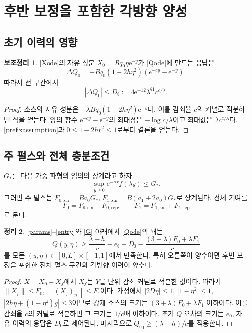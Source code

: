 \documentclass[11pt,a4paper]{article}
\theoremstyle{definition}
\newtheorem{theorem}{정리}[section]
\newtheorem{lemma}[theorem]{보조정리}
\theoremstyle{remark}\newtheorem{remark}[theorem]{주의}
\newcommand{\norm}[1]{\left\lVert #1\right\rVert}
\newcommand{\e}{\mathrm e}
\newcommand{\rep}{\mathrm{rep}}
\newcommand{\eq}{\mathrm{eq}}
\newcommand{\sm}{\mathrm{sm}}
\begin{document}
\section{후반 보정을 포함한 각방향 양성}
\subsection{초기 이력의 영향}
\begin{lemma}\label{memory}
\eqref{Xode}의 자유 성분 $X_0=Bq_0\eta\e^{-y}$가 \eqref{Qode}에 만드는 응답은
\begin{equation}
 \Delta Q_0=-Bq_0(1-2h\eta^2)(\e^{-cy}-\e^{-y}).
\end{equation}
따라서 전 구간에서
\begin{equation}\label{D0}
 |\Delta Q_0|\le D_0:=4\e^{-12}\lambda^{61}c^{c/\lambda}.
\end{equation}
\end{lemma}
\begin{proof}
소스의 자유 성분은 $-\lambda Bq_0(1-2h\eta^2)\e^{-y}$다. 이를 감쇠율 $c$의 커널로 적분하면 식을 얻는다. 양의 함수 $\e^{-cy}-\e^{-y}$의 최대점은 $-\log c/\lambda$이고 최대값은 $\lambda c^{c/\lambda}$다. \eqref{prefixassumption}과 $0\le1-2h\eta^2\le1$로부터 결론을 얻는다.
\end{proof}

\subsection{주 펄스와 전체 충분조건}
$G_*$를 다음 가중 파형의 임의의 상계라고 하자.
\begin{equation}\label{G}
 \sup_{y\ge0}\e^{-\alpha y}f(\lambda y)\le G_*.
\end{equation}
그러면 주 펄스는 $F_{0,\sm}=Ba_0G_*$,
$F_{1,\sm}=B(a_1+2a_0)G_*$로 상계된다. 전체 기여를
\begin{equation}
 F_0=F_{0,\sm}+F_{0,\rep},\qquad F_1=F_{1,\sm}+F_{1,\rep}
\end{equation}
로 둔다.

\begin{theorem}\label{positive}
\eqref{params}--\eqref{entry}와 \eqref{G} 아래에서 \eqref{Qode}의 해는
\begin{equation}\label{master}
 \boxed{Q(y,\eta)\ge\frac{\lambda-h}{c}-e_0-D_0
 -\frac{(3+\lambda)F_0+\lambda F_1}{c}}
\end{equation}
를 모든 $(y,\eta)\in[0,L]\times[-1,1]$에서 만족한다. 특히 오른쪽이 양수이면 후반 보정을 포함한 전체 펄스 구간의 각방향 이력이 양수다.
\end{theorem}
\begin{proof}
$X=X_0+X_f$에서 $X_f$는 $Y$를 단위 감쇠 커널로 적분한 값이다. 따라서 $\norm{X_f}\le F_0$, $\norm{(X_f)_\eta}\le F_1$이다. 가정에서
$|2D\eta|\le1$, $|1-\eta^2|\le1$,
$|2h\eta+(1-\eta^2)g|\le3$이므로 강제 소스의 크기는
$(3+\lambda)F_0+\lambda F_1$ 이하이다. 이를 감쇠율 $c$의 커널로 적분하면 그 크기는 $1/c$배 이하이다. 초기 $Q$ 오차의 크기는 $e_0$, 자유 이력의 응답은 $D_0$로 제어된다. 마지막으로 $Q_\eq\ge(\lambda-h)/c$를 적용한다.
\end{proof}
\end{document}
